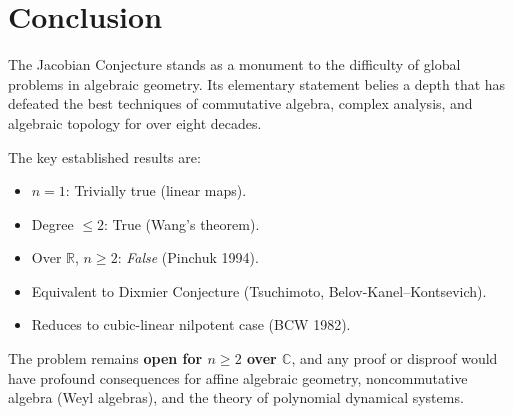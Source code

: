 \documentclass[12pt,a4paper]{amsart}
\theoremstyle{definition}
\theoremstyle{remark}
\begin{document}
\section{Conclusion}

The Jacobian Conjecture stands as a monument to the difficulty of global problems
in algebraic geometry. Its elementary statement belies a depth that has defeated
the best techniques of commutative algebra, complex analysis, and algebraic topology
for over eight decades.

The key established results are:
\begin{itemize}
  \item $n = 1$: Trivially true (linear maps).
  \item Degree $\leq 2$: True (Wang's theorem).
  \item Over $\mathbb{R}$, $n \geq 2$: \emph{False} (Pinchuk 1994).
  \item Equivalent to Dixmier Conjecture (Tsuchimoto, Belov-Kanel--Kontsevich).
  \item Reduces to cubic-linear nilpotent case (BCW 1982).
\end{itemize}

The problem remains \textbf{open for $n \geq 2$ over $\mathbb{C}$}, and any proof
or disproof would have profound consequences for affine algebraic geometry,
noncommutative algebra (Weyl algebras), and the theory of polynomial dynamical systems.
\end{document}
